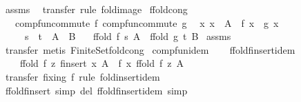 \begin{isabellebody}
%
\isadelimproof
%
\endisadelimproof
%
\isatagproof
{}\isamarkupfalse%
\ assms\ \isamarkupfalse%
\ transfer{\isacharprime}\ {\isacharparenleft}rule\ fold{\isacharunderscore}image{\isacharparenright}%
\endisatagproof
{\isafoldproof}%
%
\isadelimproof
\isanewline
%
\endisadelimproof
\isanewline
{}\isamarkupfalse%
\ ffold{\isacharunderscore}cong{\isacharcolon}\isanewline
\ \ \ {\isachardoublequoteopen}comp{\isacharunderscore}fun{\isacharunderscore}commute\ f{\isachardoublequoteclose}\ {\isachardoublequoteopen}comp{\isacharunderscore}fun{\isacharunderscore}commute\ g{\isachardoublequoteclose}\isanewline
\ \ {\isachardoublequoteopen}{\isasymAnd}x{\isachardot}\ x\ {\isacharbar}{\isasymin}{\isacharbar}\ A\ {\isasymLongrightarrow}\ f\ x\ {\isacharequal}\ g\ x{\isachardoublequoteclose}\isanewline
\ \ \ \ \ {\isachardoublequoteopen}s\ {\isacharequal}\ t{\isachardoublequoteclose}\ \ {\isachardoublequoteopen}A\ {\isacharequal}\ B{\isachardoublequoteclose}\isanewline
\ \ \ {\isachardoublequoteopen}ffold\ f\ s\ A\ {\isacharequal}\ ffold\ g\ t\ B{\isachardoublequoteclose}\isanewline
%
\isadelimproof
%
\endisadelimproof
%
\isatagproof
{}\isamarkupfalse%
\ assms\ \isamarkupfalse%
\ transfer\ {\isacharparenleft}metis\ Finite{\isacharunderscore}Set{\isachardot}fold{\isacharunderscore}cong{\isacharparenright}%
\endisatagproof
{\isafoldproof}%
%
\isadelimproof
\isanewline
%
\endisadelimproof
\isanewline
{}\isamarkupfalse%
\ comp{\isacharunderscore}fun{\isacharunderscore}idem\isanewline
{}\isanewline
\isanewline
\ \ \isamarkupfalse%
\ ffold{\isacharunderscore}finsert{\isacharunderscore}idem{\isacharcolon}\isanewline
\ \ \ \ {\isachardoublequoteopen}ffold\ f\ z\ {\isacharparenleft}finsert\ x\ A{\isacharparenright}\ {\isacharequal}\ f\ x\ {\isacharparenleft}ffold\ f\ z\ A{\isacharparenright}{\isachardoublequoteclose}\isanewline
%
\isadelimproof
\ \ \ \ %
\endisadelimproof
%
\isatagproof
{}\isamarkupfalse%
\ {\isacharparenleft}transfer\ fixing{\isacharcolon}\ f{\isacharparenright}\ {\isacharparenleft}rule\ fold{\isacharunderscore}insert{\isacharunderscore}idem{\isacharparenright}%
\endisatagproof
{\isafoldproof}%
%
\isadelimproof
\isanewline
%
\endisadelimproof
\isanewline
\ \ \isamarkupfalse%
\ ffold{\isacharunderscore}finsert\ {\isacharbrackleft}simp\ del{\isacharbrackright}\ ffold{\isacharunderscore}finsert{\isacharunderscore}idem\ {\isacharbrackleft}simp{\isacharbrackright}\isanewline

\end{isabellebody}

